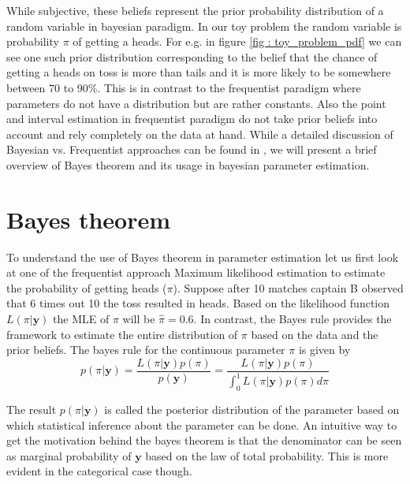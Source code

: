 While subjective, these beliefs represent the prior probability distribution of a random variable in bayesian paradigm. In our toy problem the random variable is probability $\pi$ of getting a heads. For e.g. in figure \ref{fig : toy_problem_pdf} we can see one such prior distribution corresponding to the belief that the chance of getting a heads on toss is more than tails and it is more likely to be somewhere between 70 to 90\%. This is in contrast to the frequentist paradigm where parameters do not have a distribution but are rather constants. Also the point and interval estimation in frequentist paradigm do not take prior beliefs into account and rely completely on the data at hand. While a detailed discussion of Bayesian vs. Frequentist approaches can be found in \citet{lesaffre_bayesian_2012}, we will present a brief overview of Bayes theorem and its usage in bayesian parameter estimation.

\section{Bayes theorem}
\label{sec : bayes_theorem}
To understand the use of Bayes theorem in parameter estimation let us first look at one of the frequentist approach Maximum likelihood estimation to estimate the probability of getting heads ($\pi$). Suppose after 10 matches captain B observed that 6 times out 10 the toss resulted in heads. Based on the likelihood function $L(\pi|\boldsymbol{y})$ the MLE of $\pi$ will be $\hat{\pi} = 0.6$. In contrast, the Bayes rule provides the framework to estimate the entire distribution of $\pi$ based on the data and the prior beliefs. The bayes rule for the continuous parameter $\pi$ is given by\\

\begin{equation}
\label{eq : bayes_rule}
p(\pi|\boldsymbol{y}) = \dfrac{L(\pi|\boldsymbol{y})p(\pi)}{p(\boldsymbol{y})} = \dfrac{L(\pi|\boldsymbol{y})p(\pi)}{\int_{0}^{1}L(\pi|\boldsymbol{y})p(\pi)d\pi}
\end{equation}

The result $p(\pi|\boldsymbol{y})$ is called the posterior distribution of the parameter based on which statistical inference about the parameter can be done. An intuitive way to get the motivation behind the bayes theorem is that the denominator can be seen as marginal probability of $\boldsymbol{y}$ based on the law of total probability. This is more evident in the categorical case though. 

